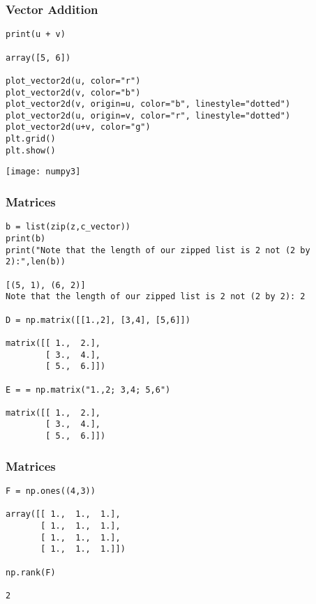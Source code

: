  \begin{frame}[fragile] \frametitle{Vector Addition}

\begin{lstlisting}
print(u + v)

array([5, 6])

plot_vector2d(u, color="r")
plot_vector2d(v, color="b")
plot_vector2d(v, origin=u, color="b", linestyle="dotted")
plot_vector2d(u, origin=v, color="r", linestyle="dotted")
plot_vector2d(u+v, color="g")
plt.grid()
plt.show()
\end{lstlisting}

\begin{center}
\texttt{[image: numpy3]}
\end{center}

\end{frame}

 \begin{frame}[fragile] \frametitle{Matrices}

\begin{lstlisting}
b = list(zip(z,c_vector))
print(b)
print("Note that the length of our zipped list is 2 not (2 by 2):",len(b))

[(5, 1), (6, 2)]
Note that the length of our zipped list is 2 not (2 by 2): 2

D = np.matrix([[1.,2], [3,4], [5,6]])

matrix([[ 1.,  2.],
        [ 3.,  4.],
        [ 5.,  6.]])
				
E = = np.matrix("1.,2; 3,4; 5,6")

matrix([[ 1.,  2.],
        [ 3.,  4.],
        [ 5.,  6.]])
\end{lstlisting}

\end{frame}

 \begin{frame}[fragile] \frametitle{Matrices}

\begin{lstlisting}
F = np.ones((4,3))

array([[ 1.,  1.,  1.],
       [ 1.,  1.,  1.],
       [ 1.,  1.,  1.],
       [ 1.,  1.,  1.]])

np.rank(F)

2

\end{lstlisting}

\end{frame}


